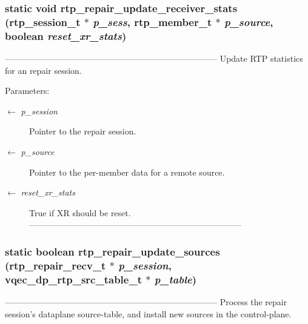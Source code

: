 \subsubsection{\setlength{\rightskip}{0pt plus 5cm}static void rtp\_\-repair\_\-update\_\-receiver\_\-stats (rtp\_\-session\_\-t $\ast$ {\em p\_\-sess}, rtp\_\-member\_\-t $\ast$ {\em p\_\-source}, boolean {\em reset\_\-xr\_\-stats})\hspace{0.3cm}{\tt  [static]}}\label{rtp__repair__recv_8c_9487dd2a811919c4dd7b055f3a1bbffc}


--------------------------------------------------------------------------- Update RTP statistics for an repair session.

\begin{Desc}
\item[Parameters:]
\begin{description}
\item[\mbox{$\leftarrow$} {\em p\_\-session}]Pointer to the repair session. \item[\mbox{$\leftarrow$} {\em p\_\-source}]Pointer to the per-member data for a remote source. \item[\mbox{$\leftarrow$} {\em reset\_\-xr\_\-stats}]True if XR should be reset. --------------------------------------------------------------------------- \end{description}
\end{Desc}
\subsubsection{\setlength{\rightskip}{0pt plus 5cm}static boolean rtp\_\-repair\_\-update\_\-sources (\bf{rtp\_\-repair\_\-recv\_\-t} $\ast$ {\em p\_\-session}, vqec\_\-dp\_\-rtp\_\-src\_\-table\_\-t $\ast$ {\em p\_\-table})\hspace{0.3cm}{\tt  [static]}}\label{rtp__repair__recv_8c_074199be8833724656fb8c95054dce2b}


--------------------------------------------------------------------------- Process the repair session's dataplane source-table, and install new sources in the control-plane.

